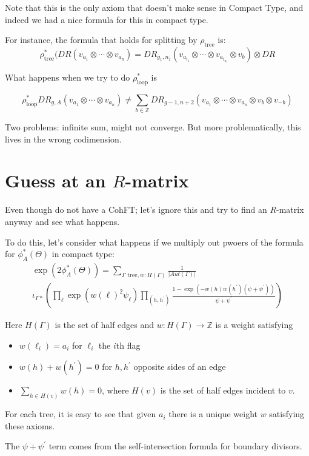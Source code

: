 \documentclass{amsart}
\theoremstyle{definition}
\newcommand{\Z}{\mathbb{Z}}
\newcommand{\Aut}{Aut}
\begin{document}
Note that this is the only axiom that doesn't make sense in Compact Type, and indeed we had a nice formula for this in compact type.


For instance, the formula that holds for splitting by $\rho_{\text{tree}}$ is:
$$\rho_{\text{tree}}^*(DR(v_{a_1}\otimes\cdots\otimes v_{a_n})=
DR_{g_1,n_1}(v_{a_{i_1}}\otimes\cdots\otimes v_{a_{i_{n_1}}}\otimes v_b)\otimes DR $$


What happens when we try to do $\rho_{\text{loop}}^*$ is

$$\rho_{\text{loop}}^*DR_{g,A}(v_{a_1}\otimes\cdots\otimes v_{a_n})
\neq \sum_{b\in\Z} DR_{g-1, n+2}(v_{a_1}\otimes\cdots\otimes v_{a_n}\otimes v_b\otimes v_{-b})$$

Two problems: infinite sum, might not converge.  But more problematically, this lives in the wrong codimension.

\section{Guess at an $R$-matrix}

Even though do not have a CohFT; let's ignore this and try to find an $R$-matrix anyway and see what happens.

To do this, let's consider what happens if we multiply out pwoers of the formula for $\phi_A^*(\Theta)$ in compact type:
 \begin{multline*}
\exp (2\phi_A^*(\Theta))=\sum_{\Gamma \text{ tree}, w:H(\Gamma)}\frac{1}{|\Aut(\Gamma)|}\\
 \iota_{\Gamma*}\left( \prod_{\ell} \exp(w(\ell)^2\psi_\ell) \prod_{(h,h^\prime)} \frac{1-\exp(-w(h)w(h^\prime)(\psi+\psi^\prime))}{\psi+\psi^\prime}\right) 
\end{multline*}

Here $H(\Gamma)$ is the set of half edges and $w:H(\Gamma)\to\Z$ is a weight satisfying 
\begin{itemize}
\item $w(\ell_i)=a_i$ for $\ell_i$ the $i$th flag
\item $w(h)+w(h^\prime)=0$ for $h, h^\prime$ opposite sides of an edge
\item $\sum_{h\in H(v)} w(h)=0$, where $H(v)$ is the set of half edges incident to $v$.
\end{itemize}

For each tree, it is easy to see that given $a_i$ there is a unique weight $w$ satisfying these axioms.

The $\psi+\psi^\prime$ term comes from the self-intersection formula for boundary divisors.
\end{document}
